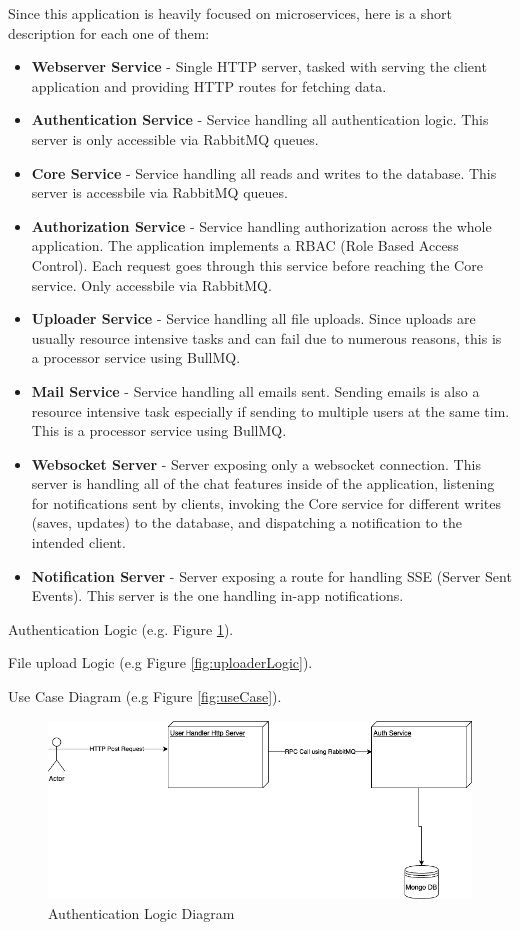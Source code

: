Since this application is heavily focused on microservices, here is a short description for each one of them:
\begin{itemize}
    \item \textbf{Webserver Service} - Single HTTP server, tasked with serving the client application and providing HTTP routes for fetching data.
    \item \textbf{Authentication Service} - Service handling all authentication logic. This server is only accessible via RabbitMQ queues.
    \item \textbf{Core Service} - Service handling all reads and writes to the database. This server is accessbile via RabbitMQ queues.
    \item \textbf{Authorization Service} - Service handling authorization across the whole application. The application implements a RBAC (Role Based Access Control). Each request goes through this service before reaching the Core service. Only accessbile via RabbitMQ.
    \item \textbf{Uploader Service} - Service handling all file uploads. Since uploads are usually resource intensive tasks and can fail due to numerous reasons, this is a processor service using BullMQ.
    \item \textbf{Mail Service} - Service handling all emails sent. Sending emails is also a resource intensive task especially if sending to multiple users at the same tim. This is a processor service using BullMQ.
    \item \textbf{Websocket Server} - Server exposing only a websocket connection. This server is handling all of the chat features inside of the application, listening for notifications sent by clients, invoking the Core service for different writes (saves, updates) to the database, and dispatching a notification to the intended client.
    \item \textbf{Notification Server} - Server exposing a route for handling SSE (Server Sent Events). This server is the one handling in-app notifications. 
\end{itemize}

Authentication Logic (e.g. Figure \ref{fig:authLogic}).

File upload Logic (e.g Figure \ref{fig:uploaderLogic}).

Use Case Diagram (e.g Figure \ref{fig:useCase}).
\begin{figure}[!ht]
    \centering
    \includegraphics[width=1\linewidth]{login.drawio.png}
    \caption{Authentication Logic Diagram}
    \label{fig:authLogic}
\end{figure}

